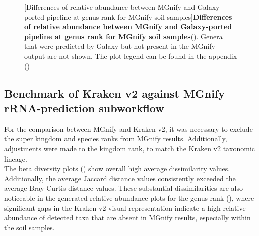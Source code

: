 \begin{figure}[H]
  \centering
  [Differences of relative abundance between MGnify and Galaxy-ported pipeline at genus rank for MGnify soil samples]{\textbf{Differences of relative abundance between MGnify and Galaxy-ported pipeline at genus rank for MGnify soil samples}(). Genera that were predicted by Galaxy but not present in the MGnify output are not shown. The plot legend can be found in the appendix ()} \label{fig:mgnify_soil_rel_abundace_g_level}%
\end{figure}


\subsection{Benchmark of Kraken v2 against MGnify rRNA-prediction subworkflow}\label{subsec:mgnifyVSkraken2}
For the comparison between MGnify and Kraken v2, it was necessary to exclude the super kingdom and species ranks from MGnify results. Additionally, adjustments were made to the kingdom rank, to match the Kraken v2 taxonomic lineage.\\
The beta diversity plots () show overall high average dissimilarity values. Additionally, the average Jaccard distance values consistently exceeded the average Bray Curtis distance values. These substantial dissimilarities are also noticeable in the generated relative abundance plots for the genus rank (), where significant gaps in the Kraken v2 visual representation indicate a high relative abundance of detected taxa that are absent in MGnify results, especially within the soil samples.\\

